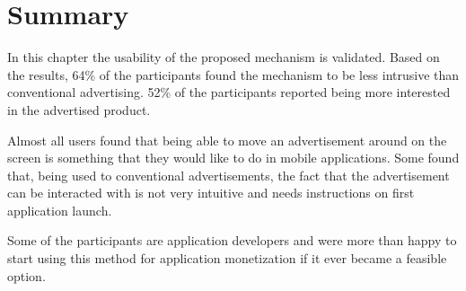 \section{Summary}

In this chapter the usability of the proposed mechanism is validated. Based on the results, 64\% of the participants found the mechanism to be less intrusive than conventional advertising. 52\% of the participants reported being more interested in the advertised product.

Almost all users found that being able to move an advertisement around on the screen is something that they would like to do in mobile applications. Some found that, being used to conventional advertisements, the fact that the advertisement can be interacted with is not very intuitive and needs instructions on first application launch.

Some of the participants are application developers and were more than happy to start using this method for application monetization if it ever became a feasible option.